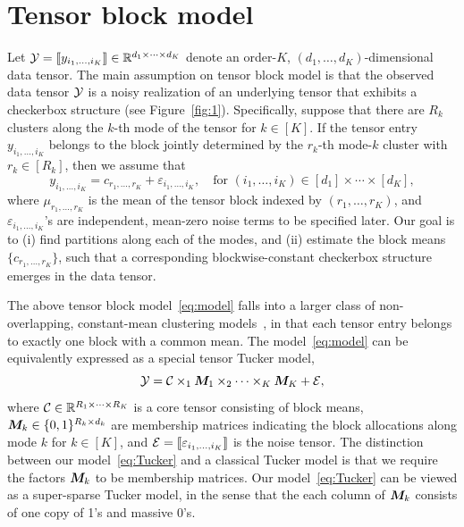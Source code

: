 \documentclass{article}
\begin{document}
\section{Tensor block model}
Let $\mathcal{Y}=\llbracket y_{i_1,\ldots,i_K} \rrbracket\in\mathbb{R}^{d_1\times \cdots\times d_K}$ denote an order-$K$, $(d_1,\ldots,d_K)$-dimensional data tensor. The main assumption on tensor block model is that the observed data tensor $\mathcal{Y}$ is a noisy realization of an underlying tensor that exhibits a checkerbox structure (see Figure~\ref{fig:1}). Specifically, suppose that there are $R_k$ clusters along the $k$-th mode of the tensor for $k\in[K]$. If the tensor entry $y_{i_1,\ldots,i_K}$ belongs to the block jointly determined by the $r_k$-th mode-$k$ cluster with $r_k\in[R_k]$, then we assume that 
\begin{equation}\label{eq:model}
y_{i_1,\ldots,i_K}=c_{r_1,\ldots,r_K}+\varepsilon_{i_1,\ldots,i_K},\quad \text{for }(i_1,\ldots,i_K)\in[d_1]\times\cdots\times [d_K],
\end{equation}
where $\mu_{r_1,\ldots,r_K}$ is the mean of the tensor block indexed by $(r_1,\ldots,r_K)$, and $\varepsilon_{i_1,\ldots,i_K}$'s are independent, mean-zero noise terms to be specified later. Our goal is to (i) find partitions along each of the modes, and (ii) estimate the block means $\{c_{r_1,\ldots,r_K}\}$, such that a corresponding blockwise-constant checkerbox structure emerges in the data tensor. 

The above tensor block model~\eqref{eq:model} falls into a larger class of non-overlapping, constant-mean clustering models~\cite{madeira2004biclustering}, in that each tensor entry belongs to exactly one block with a common mean. The model~\eqref{eq:model} can be equivalently expressed as a special tensor Tucker model,
\begin{equation}\label{eq:Tucker}
\mathcal{Y}=\mathcal{C}\times_1\bm M_1\times_2\cdots \times_K \bm M_K+\mathcal{E},
\end{equation}
where $\mathcal{C}\in\mathbb{R}^{R_1\times\cdots\times R_K}$ is a core tensor consisting of block means, $\bm M_k \in\{0,1\}^{R_k\times d_k}$ are membership matrices indicating the block allocations along mode $k$ for $k\in[K]$, and $\mathcal{E}=\llbracket \varepsilon_{i_1,\ldots,i_K} \rrbracket$ is the noise tensor. The distinction between our model~\eqref{eq:Tucker} and a classical Tucker model is that we require the factors $\bm M_k$ to be membership matrices. Our model~\eqref{eq:Tucker} can be viewed as a super-sparse Tucker model, in the sense that the each column of $\bm M_k$ consists of one copy of 1's and massive 0's. 
\end{document}
